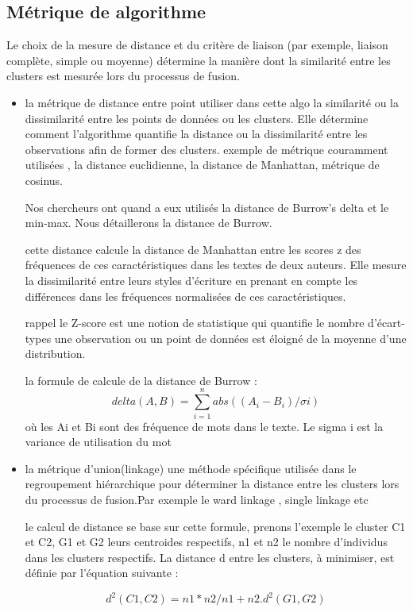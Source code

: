 \documentclass[]{report}
\begin{document}
\subsection{Métrique de algorithme }
Le choix de la mesure de distance et du critère de liaison (par exemple, liaison
complète, simple ou moyenne) détermine la manière dont la similarité entre les
clusters est mesurée lors du processus de fusion.
\begin{itemize}
\item la métrique  de distance entre point utiliser dans cette algo la
similarité ou la dissimilarité entre les points de données ou les clusters. Elle
détermine comment l'algorithme quantifie la distance ou la dissimilarité entre
les observations afin de former des clusters.  exemple de métrique couramment
utilisées , la distance euclidienne, la distance de Manhattan, métrique de
cosinus.
	
Nos chercheurs ont quand a eux utilisés la distance de Burrow's delta et le
min-max. Nous détaillerons la distance de Burrow.
	
cette distance calcule la distance de Manhattan entre les scores z des
fréquences de ces caractéristiques dans les textes de deux auteurs. Elle mesure
la dissimilarité entre leurs styles d'écriture en prenant en compte les
différences dans les fréquences normalisées de ces caractéristiques.
	  
rappel le Z-score est une notion de statistique qui quantifie le nombre
d'écart-types une observation ou un point de données est éloigné de la moyenne
d'une distribution.
	  
la formule de calcule de la distance de Burrow :
\[ delta(A,B)= \sum_{i=1}^n abs((A_i - B_i)/ \sigma i ) \] où les Ai et Bi sont
des fréquence de mots dans le texte.  Le sigma i est la variance de utilisation
du mot
	  
\item la métrique d'union(linkage) une méthode spécifique utilisée dans le
regroupement hiérarchique pour déterminer la distance entre les clusters lors du
processus de fusion.Par exemple le ward linkage , single linkage etc 
	
le calcul de distance se base sur cette formule,  prenons l'exemple le cluster
C1 et C2,  G1 et G2 leurs centroides respectifs,  n1 et n2 le nombre d'individus
dans les clusters respectifs.  La distance d entre les clusters, à minimiser,
est définie par l'équation suivante :
	
\[d^2( C1,C2) = n1 * n2 / n1 + n2 . d^2(G1,G2)\]
	 
\end{itemize}
\end{document}
